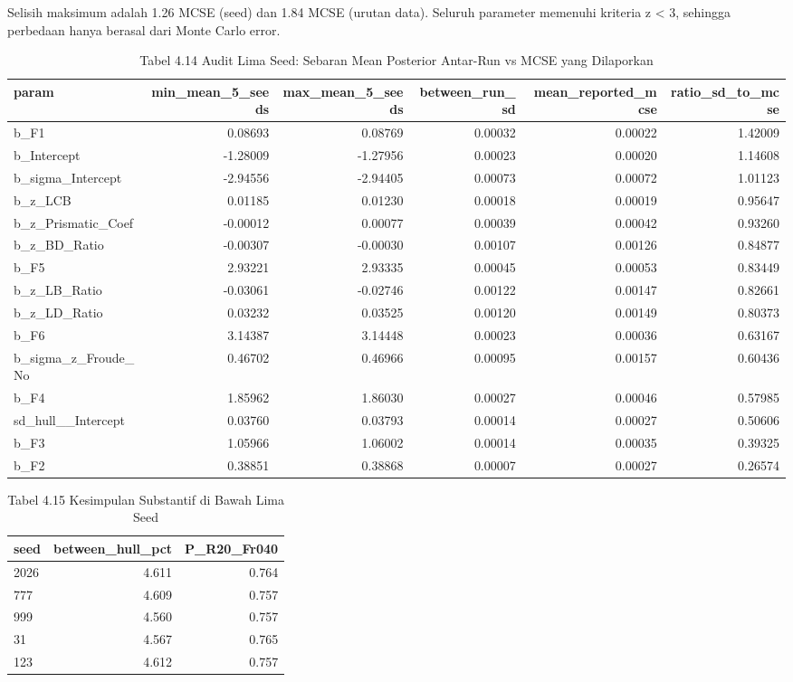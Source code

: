 \documentclass[
]{article}
\begin{document}
Selisih maksimum adalah 1.26 MCSE (seed) dan 1.84 MCSE (urutan data).
Seluruh parameter memenuhi kriteria \textbar z\textbar{} \textless{} 3,
sehingga perbedaan hanya berasal dari Monte Carlo error.

\begingroup\fontsize{8.5}{10.5}\selectfont

\begin{longtable}[t]{lrrrrr}
\caption{\label{tab:tabel_multiseed}Tabel 4.14 Audit Lima Seed: Sebaran Mean Posterior Antar-Run vs MCSE yang Dilaporkan}\\
\toprule
param & min\_mean\_5\_seeds & max\_mean\_5\_seeds & between\_run\_sd & mean\_reported\_mcse & ratio\_sd\_to\_mcse\\
\midrule
b\_F1 & 0.08693 & 0.08769 & 0.00032 & 0.00022 & 1.42009\\
b\_Intercept & -1.28009 & -1.27956 & 0.00023 & 0.00020 & 1.14608\\
b\_sigma\_Intercept & -2.94556 & -2.94405 & 0.00073 & 0.00072 & 1.01123\\
b\_z\_LCB & 0.01185 & 0.01230 & 0.00018 & 0.00019 & 0.95647\\
b\_z\_Prismatic\_Coef & -0.00012 & 0.00077 & 0.00039 & 0.00042 & 0.93260\\
\addlinespace
b\_z\_BD\_Ratio & -0.00307 & -0.00030 & 0.00107 & 0.00126 & 0.84877\\
b\_F5 & 2.93221 & 2.93335 & 0.00045 & 0.00053 & 0.83449\\
b\_z\_LB\_Ratio & -0.03061 & -0.02746 & 0.00122 & 0.00147 & 0.82661\\
b\_z\_LD\_Ratio & 0.03232 & 0.03525 & 0.00120 & 0.00149 & 0.80373\\
b\_F6 & 3.14387 & 3.14448 & 0.00023 & 0.00036 & 0.63167\\
\addlinespace
b\_sigma\_z\_Froude\_No & 0.46702 & 0.46966 & 0.00095 & 0.00157 & 0.60436\\
b\_F4 & 1.85962 & 1.86030 & 0.00027 & 0.00046 & 0.57985\\
sd\_hull\_\_Intercept & 0.03760 & 0.03793 & 0.00014 & 0.00027 & 0.50606\\
b\_F3 & 1.05966 & 1.06002 & 0.00014 & 0.00035 & 0.39325\\
b\_F2 & 0.38851 & 0.38868 & 0.00007 & 0.00027 & 0.26574\\
\bottomrule
\end{longtable}
\endgroup{}

\begingroup\fontsize{8.5}{10.5}\selectfont

\begin{longtable}[t]{lrr}
\caption{\label{tab:tabel_seedconcl}Tabel 4.15 Kesimpulan Substantif di Bawah Lima Seed}\\
\toprule
seed & between\_hull\_pct & P\_R20\_Fr040\\
\midrule
2026 & 4.611 & 0.764\\
777 & 4.609 & 0.757\\
999 & 4.560 & 0.757\\
31 & 4.567 & 0.765\\
123 & 4.612 & 0.757\\
\bottomrule
\end{longtable}
\endgroup{}
\end{document}
